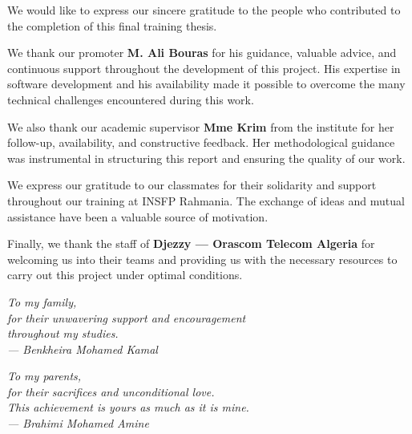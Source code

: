 \documentclass{bts-report}
\begin{document}
\maketitlepage

\frontmatter

\begin{remerciements}
We would like to express our sincere gratitude to the people who contributed to the completion of this final training thesis.

We thank our promoter \textbf{M. Ali Bouras} for his guidance, valuable advice, and continuous support throughout the development of this project. His expertise in software development and his availability made it possible to overcome the many technical challenges encountered during this work.

We also thank our academic supervisor \textbf{Mme Krim} from the institute for her follow-up, availability, and constructive feedback. Her methodological guidance was instrumental in structuring this report and ensuring the quality of our work.

We express our gratitude to our classmates for their solidarity and support throughout our training at INSFP Rahmania. The exchange of ideas and mutual assistance have been a valuable source of motivation.

Finally, we thank the staff of \textbf{Djezzy --- Orascom Telecom Algeria} for welcoming us into their teams and providing us with the necessary resources to carry out this project under optimal conditions.
\end{remerciements}

\begin{dedicace}
\begin{center}
\textit{To my family,}\\
\textit{for their unwavering support and encouragement}\\
\textit{throughout my studies.}\\[0.5cm]
\textit{--- Benkheira Mohamed Kamal}
\end{center}
\end{dedicace}

\begin{dedicace}
\begin{center}
\textit{To my parents,}\\
\textit{for their sacrifices and unconditional love.}\\
\textit{This achievement is yours as much as it is mine.}\\[0.5cm]
\textit{--- Brahimi Mohamed Amine}
\end{center}
\end{dedicace}
\end{document}
